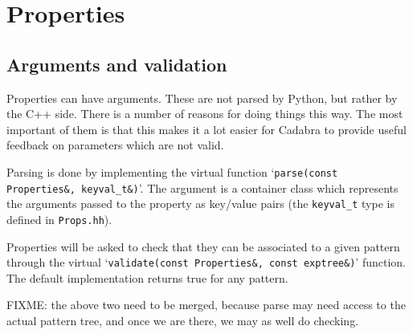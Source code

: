 
\section{Properties}

\subsection{Arguments and validation}

Properties can have arguments. These are not parsed by Python, but
rather by the C++ side. There is a number of reasons for doing things
this way. The most important of them is that this makes it a lot
easier for Cadabra to provide useful feedback on parameters which are
not valid.

Parsing is done by implementing the virtual function
`\verb|parse(const Properties&, keyval_t&)|'. The argument is a
container class which represents the arguments passed to the property
as key/value pairs (the \verb|keyval_t| type is defined in
\verb|Props.hh|).

Properties will be asked to check that they can be associated to a
given pattern through the virtual
`\verb|validate(const Properties&, const exptree&)|' function. The
default implementation returns true for any pattern.

FIXME: the above two need to be merged, because parse may need access
to the actual pattern tree, and once we are there, we may as well
do checking.
